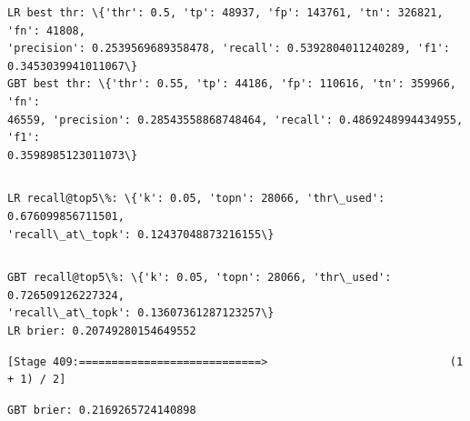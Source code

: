 \documentclass[11pt]{article}
\begin{document}
    \begin{Verbatim}[commandchars=\\\{\}]
LR best thr: \{'thr': 0.5, 'tp': 48937, 'fp': 143761, 'tn': 326821, 'fn': 41808,
'precision': 0.2539569689358478, 'recall': 0.5392804011240289, 'f1':
0.3453039941011067\}
GBT best thr: \{'thr': 0.55, 'tp': 44186, 'fp': 110616, 'tn': 359966, 'fn':
46559, 'precision': 0.28543558868748464, 'recall': 0.4869248994434955, 'f1':
0.3598985123011073\}
    \end{Verbatim}

    \begin{Verbatim}[commandchars=\\\{\}]

    \end{Verbatim}

    \begin{Verbatim}[commandchars=\\\{\}]
LR recall@top5\%: \{'k': 0.05, 'topn': 28066, 'thr\_used': 0.676099856711501,
'recall\_at\_topk': 0.12437048873216155\}
    \end{Verbatim}

    \begin{Verbatim}[commandchars=\\\{\}]

    \end{Verbatim}

    \begin{Verbatim}[commandchars=\\\{\}]
GBT recall@top5\%: \{'k': 0.05, 'topn': 28066, 'thr\_used': 0.726509126227324,
'recall\_at\_topk': 0.13607361287123257\}
LR brier: 0.20749280154649552
    \end{Verbatim}

    \begin{Verbatim}[commandchars=\\\{\}]
[Stage 409:============================>                            (1 + 1) / 2]
    \end{Verbatim}

    \begin{Verbatim}[commandchars=\\\{\}]
GBT brier: 0.2169265724140898
    \end{Verbatim}

    \begin{Verbatim}[commandchars=\\\{\}]

    \end{Verbatim}
\end{document}
